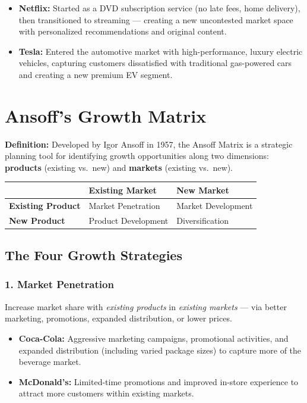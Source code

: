 \documentclass[11pt, letterpaper]{article}
\begin{document}
\begin{itemize}[leftmargin=*]
  \item \textbf{Netflix:} Started as a DVD subscription service (no late fees, home delivery), then transitioned to streaming --- creating a new uncontested market space with personalized recommendations and original content.
  \item \textbf{Tesla:} Entered the automotive market with high-performance, luxury electric vehicles, capturing customers dissatisfied with traditional gas-powered cars and creating a new premium EV segment.
\end{itemize}

\newpage

\section{Ansoff's Growth Matrix}

\begin{defbox}
\textbf{Definition:} Developed by Igor Ansoff in 1957, the Ansoff Matrix is a strategic planning tool for identifying growth opportunities along two dimensions: \textbf{products} (existing vs.\ new) and \textbf{markets} (existing vs.\ new).
\end{defbox}

\begin{center}
\begin{tabular}{p{3cm} p{4.5cm} p{4.5cm}}
\toprule
 & \textbf{Existing Market} & \textbf{New Market} \\
\midrule
\textbf{Existing Product} & Market Penetration & Market Development \\
\addlinespace
\textbf{New Product} & Product Development & Diversification \\
\bottomrule
\end{tabular}
\end{center}

\subsection{The Four Growth Strategies}

\subsubsection{1. Market Penetration}
Increase market share with \textit{existing products} in \textit{existing markets} --- via better marketing, promotions, expanded distribution, or lower prices.
\begin{itemize}[leftmargin=*]
  \item \textbf{Coca-Cola:} Aggressive marketing campaigns, promotional activities, and expanded distribution (including varied package sizes) to capture more of the beverage market.
  \item \textbf{McDonald's:} Limited-time promotions and improved in-store experience to attract more customers within existing markets.
\end{itemize}
\end{document}
